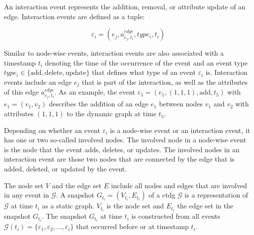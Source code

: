 An interaction event represents the addition, removal, or attribute update of an edge. Interaction events are defined as a tuple:

\begin{equation}
    \varepsilon_{i} = (e_j, a^{edge}_{e_j, t_i}, type_{i}, t_i)
\end{equation}

Similar to node-wise events, interaction events are also associated with a timestamp $t_i$ denoting the time of the occurrence of the event and an event type ${type_{i} \in \{\mathrm{add}, \mathrm{delete}, \mathrm{update}\}}$ that defines what type of an event $\varepsilon_i$ is. Interaction events include an edge $e_j$ that is part of the interaction, as well as the attributes of this edge $a^{edge}_{e_j, t_i}$. As an example, the event $\varepsilon_5 = (e_1, (1,1,1), \mathrm{add}, t_5)$ with $e_1 = (v_1, v_2)$ describes the addition of an edge $e_1$ between nodes $v_1$ and $v_2$ with attributes $(1,1,1)$ to the dynamic graph at time $t_5$.

Depending on whether an event $\varepsilon_i$ is a node-wise event or an interaction event, it has one or two so-called involved nodes. The involved node in a node-wise event is the node that the event adds, deletes, or updates. The involved nodes in an interaction event are those two nodes that are connected by the edge that is added, deleted, or updated by the event. 

The node set $V$ and the edge set $E$ include all nodes and edges that are involved in any event in $\mathcal{G}$. A snapshot $G_{t_i} = (V_{t_i}, E_{t_i})$ of a \gls{ctdg} $\mathcal{G}$ is a representation of $\mathcal{G}$ at time $t_i$ as a static graph. $V_{t_i}$ is the node set and $E_{t_i}$ the edge set in the snapshot $G_{t_i}$. The snapshot $G_{t_i}$ at time $t_i$ is constructed from all events $\mathcal{G}(t_i) = \{\varepsilon_1, \varepsilon_2, ..., \varepsilon_i\}$ that occurred before or at timestamp $t_i$.

